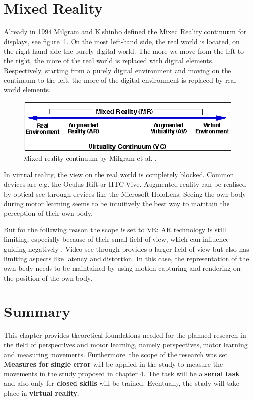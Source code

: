 \section{Mixed Reality}
Already in 1994 Milgram and Kishinho \cite{Milgram1994} defined the Mixed Reality continuum for displays, see figure~\ref{fig:MRcont}. On the most left-hand side, the real world is located, on the right-hand side the purely digital world. The more we move from the left to the right, the more of the real world is replaced with digital elements. Respectively, starting from a purely digital environment and moving on the continuum to the left, the more of the digital environment is replaced by real-world elements.
\begin{figure}
	\centering
	\includegraphics[width=1.0\textwidth]{img/milgram_continuum.png}
	\caption{Mixed reality continuum by Milgram et al. \cite{Milgram1994}.}
	\label{fig:MRcont}
\end{figure}
In virtual reality, the view on the real world is completely blocked. Common devices are e.g. the Oculus Rift or HTC Vive. Augmented reality can be realised by optical see-through devices like the Microsoft HoloLens. Seeing the own body during motor learning seems to be intuitively the best way to maintain the perception of their own body.
\begin{tcolorbox}[colback=red!30!white]
But for the following reason the scope is set to VR: AR technology is still limiting, especially because of their small field of view, which can influence guiding negatively \cite{Katzakis2017}. Video see-through provides a larger field of view but also has limiting aspects like latency and distortion. In this case, the representation of the own body needs to be maintained by using motion capturing and rendering on the position of the own body.
\end{tcolorbox}

\section{Summary}
This chapter provides theoretical foundations needed for the planned research in the field of perspectives and motor learning, namely perspectives, motor learning and measuring movements. Furthermore, the scope of the research was set. \textbf{Measures for single error} will be applied in the study to measure the movements in the study proposed in chapter 4. The task will be a \textbf{serial task} and also only for \textbf{closed skills} will be trained. Eventually, the study will take place in \textbf{virtual reality}.